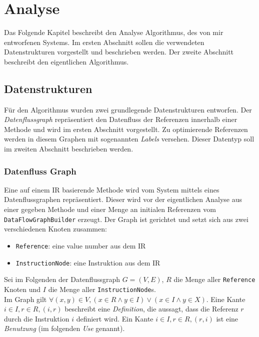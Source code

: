 \chapter{Analyse}

Das Folgende Kapitel beschreibt den Analyse Algorithmus, des von mir entworfenen Systems.
Im ersten Abschnitt sollen die verwendeten Datenstrukturen vorgestellt und beschrieben werden.
Der zweite Abschnitt beschreibt den eigentlichen Algorithmus.

\section{Datenstrukturen}

Für den Algorithmus wurden zwei grundlegende Datenstrukturen entworfen. Der 
\textit{Datenflussgraph} repräsentiert den Datenfluss der Referenzen innerhalb 
einer Methode und wird im ersten Abschnitt vorgestellt. Zu optimierende Referenzen
werden in diesem Graphen mit sogenannten \textit{Labels} versehen. Dieser Datentyp
soll im zweiten Abschnitt beschrieben werden.

\subsection{Datenfluss Graph}\label{ssec:DFG}

Eine auf einem IR basierende Methode wird vom System mittels eines Datenflussgraphen 
repräsentiert. Dieser wird vor der eigentlichen Analyse aus einer gegeben
Methode und einer Menge an initialen Referenzen vom \texttt{DataFlowGraphBuilder}
erzeugt. Der Graph ist gerichtet und setzt sich aus zwei verschiedenen Knoten zusammen:

\begin{itemize}
	\item \texttt{Reference}: eine value number aus dem IR
	\item \texttt{InstructionNode}: eine Instruktion aus dem IR
\end{itemize}

Sei im Folgenden der Datenflussgraph $G = (V, E)$, $R$ die Menge aller \texttt{Reference} 
Knoten und $I$ die Menge aller \texttt{InstructionNode}s. 
\\
Im Graph gilt $\forall (x, y) \in V,  (x \in R \wedge y \in I) \vee (x \in I \wedge y \in X)$.
Eine Kante $i \in I, r \in R, (i, r)$ beschreibt eine \textit{Definition}, die aussagt, 
dass die Referenz $r$ durch die Instruktion $i$ definiert wird. Ein Kante 
$i \in I, r \in R, (r, i)$ ist eine \textit{Benutzung} (im folgenden \textit{Use}
genannt). 

